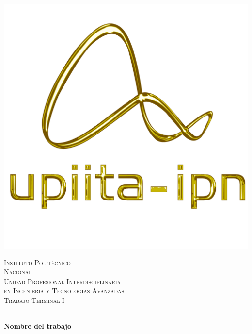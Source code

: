 \begin{center}
\begin{minipage}{0.48\textwidth}
		\begin{flushright}
			\includegraphics[scale = 0.3]{images/logo_upiita_oro.png}
		\end{flushright}
	\end{minipage}
	
	
	\vspace*{-25mm}  %
	\textsc{\Huge Instituto Polit\'ecnico\\ \vspace{15pt} Nacional}\\[20mm]
	
	\textsc{\huge Unidad Profesional Interdisciplinaria\\  \vspace{10pt} en Ingenier\'ia y Tecnolog\'ias Avanzadas}\\[20mm]
	
	\textsc{\LARGE Trabajo Terminal I}
	
	
	\vspace*{10mm}
	\HRule \\[4mm]
	{ \huge \bfseries Nombre del trabajo \\}\vspace{5mm}
	\HRule \\[15mm]
	

\end{center}
